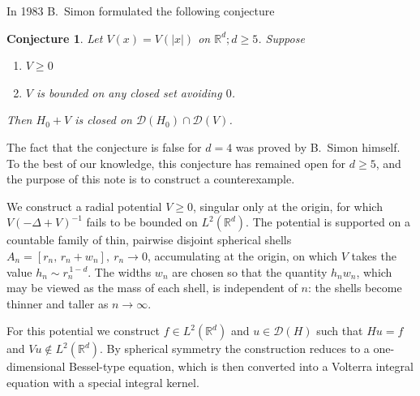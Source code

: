 \documentclass[11pt,reqno]{amsart}
\newtheorem{cnj}{Conjecture}
\newcommand{\R}{{\mathbb R}}
\begin{document}
In 1983 B.~Simon \cite{Simon2} formulated the following conjecture
\begin{cnj}\label{SimonCnj}
Let $V(x)=V(|x|)$ on $\R^d; d\geq 5$. Suppose
\begin{enumerate}
  \item $V\geq 0$
  \item $V$ is bounded on any closed set avoiding $0$.
\end{enumerate}
Then $H_0+V$ is closed on $\mathcal{D}(H_0)\cap \mathcal{D}(V)$.
\end{cnj}
The fact that the conjecture is false for $d=4$ was proved by B.~Simon \cite{Simon2} himself. To the best of our knowledge, this conjecture has remained open for $d\geq 5$, and the purpose of this note is to construct a counterexample.
\par
We construct a radial potential $V\ge0$, singular only at the origin, for which
$V(-\Delta+V)^{-1}$ fails to be bounded on $L^2(\R^d)$. The potential
is supported on a countable family of thin, pairwise disjoint spherical shells
$A_n=[r_n,\,r_n+w_n],\ r_n \to 0$, accumulating at the origin, on which $V$ takes the value
$h_n\sim r_n^{\,1-d}$. The widths $w_n$ are chosen so that the quantity $h_n w_n$, which may be viewed as the mass of each shell, is independent of $n$: the shells become thinner and taller as $n\to\infty$.
\par
For this potential we construct $f\in L^2(\R^d)$ and $u\in \mathcal{D}(H)$ such that $Hu=f$ and $Vu\notin L^2(\R^d)$. By spherical symmetry the construction reduces to a one-dimensional Bessel-type equation, which is then converted into a Volterra integral equation with a special integral kernel.
\end{document}
